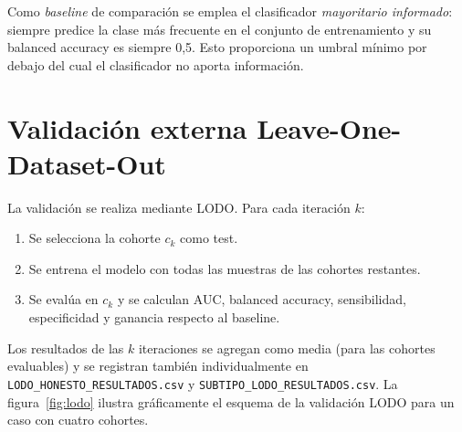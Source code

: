 \begin{table}[H]
  \centering
  \small
  \caption{Hiperparámetros y propiedades de los tres clasificadores.}
  \label{tab:hiperparametros}
\end{table}

Como \emph{baseline} de comparación se emplea el clasificador
\emph{mayoritario informado}: siempre predice la clase más frecuente en el
conjunto de entrenamiento y su balanced accuracy es siempre 0,5. Esto
proporciona un umbral mínimo por debajo del cual el clasificador no aporta
información.

\section{Validación externa Leave-One-Dataset-Out}
\label{sec:lodo}

La validación se realiza mediante LODO. Para cada iteración $k$:

\begin{enumerate}
  \item Se selecciona la cohorte $c_k$ como test.
  \item Se entrena el modelo con todas las muestras de las cohortes
  restantes.
  \item Se evalúa en $c_k$ y se calculan AUC, balanced accuracy,
  sensibilidad, especificidad y ganancia respecto al baseline.
\end{enumerate}

Los resultados de las $k$ iteraciones se agregan como media (para las
cohortes evaluables) y se registran también individualmente en
\texttt{LODO\_HONESTO\_RESULTADOS.csv} y
\texttt{SUBTIPO\_LODO\_RESULTADOS.csv}. La figura~\ref{fig:lodo} ilustra
gráficamente el esquema de la validación LODO para un caso con cuatro
cohortes.

